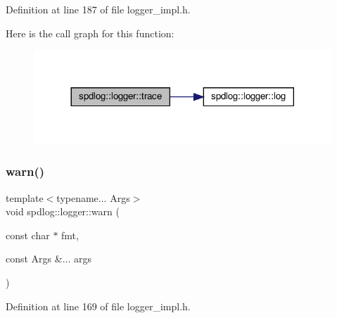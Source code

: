 Definition at line 187 of file logger\+\_\+impl.\+h.

Here is the call graph for this function\+:
\nopagebreak
\begin{figure}[H]
\begin{center}
\leavevmode
\includegraphics[width=317pt]{classspdlog_1_1logger_a66e008d30a46c33283c4546f3851a80a_cgraph}
\end{center}
\end{figure}
\mbox{\label{classspdlog_1_1logger_aa1027cf4e4d6fd7fcf361534affe7bdc}} 
\subsubsection{\texorpdfstring{warn()}{warn()}\hspace{0.1cm}{\footnotesize\ttfamily [1/2]}}
{\footnotesize\ttfamily template$<$typename... Args$>$ \\
void spdlog\+::logger\+::warn (\begin{DoxyParamCaption}\item[{const char $\ast$}]{fmt,  }\item[{const Args \&...}]{args }\end{DoxyParamCaption})\hspace{0.3cm}{\ttfamily [inline]}}



Definition at line 169 of file logger\+\_\+impl.\+h.

